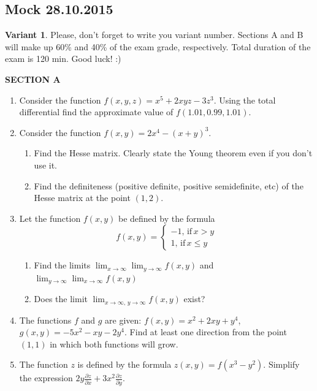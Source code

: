 \documentclass[12pt]{article} %
\theoremstyle{definition} %
\begin{document}
\subsection{Mock 28.10.2015}


\textbf{Variant 1}. Please, don't forget to write you variant number. Sections A and B will make up 60\% and 40\% of the exam grade, respectively. Total duration of the exam is 120 min. Good luck! :)



\textbf{SECTION A}

\begin{enumerate}

\item Consider the function $f(x,y,z)=x^5+2xyz-3z^3$. Using the total differential find the approximate value of $f(1.01,0.99,1.01)$.

\item Consider the function $f(x,y)=2x^4-(x+y)^3$.
\begin{enumerate}
\item Find the Hesse matrix. Clearly state the Young theorem even if you don't use it.
\item Find the definiteness (positive definite, positive semidefinite, etc) of the Hesse matrix at the point $(1,2)$.
\end{enumerate}

\item Let the function $f(x,y)$ be defined by the formula
\[
f(x,y)=\begin{cases}
-1, \, \text{if} \, x>y \\
1, \, \text{if} \, x\leq y
\end{cases}
\]

\begin{enumerate}
\item Find the limits $\lim_{x\to\infty}\lim_{y\to \infty} f(x,y)$ and $\lim_{y\to\infty}\lim_{x\to \infty} f(x,y)$
\item Does the limit $\lim_{x\to\infty, \, y\to \infty} f(x,y)$ exist?
\end{enumerate}


\item The functions $f$ and $g$ are given: $f(x,y)=x^2+2xy+y^4$, $g(x,y)=-5x^2-xy-2y^4$. Find at least one direction from the point $(1,1)$ in which both functions will grow.

\item The function $z$ is defined by the formula $z(x,y)=f(x^3-y^2)$. Simplify the expression $2y\frac{\partial z}{\partial x}+3x^2\frac{\partial z}{\partial y}$.


\end{enumerate}
\end{document}
